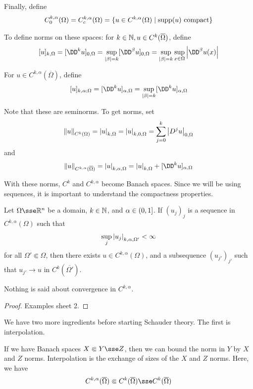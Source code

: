 \documentclass{article}
\begin{document}
Finally, define
\[C^{k, \alpha}_0(\Omega)=  C^{k, \alpha}_c(\Omega) = \{u \in C^{k, \alpha}(\Omega) \mid \operatorname{supp}(u) \text{ compact}\}\]

To define norms on these spaces: for \(k \in \mathbb{N}, u \in C^k(\overline\Omega)\), define
\[[u]_{k, \Omega} = [\DD^k u]_{0, \Omega} = \sup_{\abs{\beta} = k}[\DD^\beta u]_{0, \Omega} = \sup_{\abs{\beta} = k}\sup_{x \in \Omega}\abs{\DD^\beta u(x)}\]

For \(u \in C^{k, \alpha}(\overline \Omega)\), define
\[[u]_{k, \alpha; \Omega} = [\DD^ku]_{\alpha, \Omega} = \sup_{\abs{\beta} = k}[\DD^ku]_{\alpha, \Omega}\]

Note that these are seminorms. To get norms, set
\[\norm{u}_{C^k(\Omega)} = \abs{u}_{k, \Omega} = \abs{u}_{k, 0, \Omega} = \sum_{j=0}^k\abs{D^j u}_{0, \Omega}\]
and
\[\norm{u}_{C^{k, \alpha}(\overline\Omega)} = \abs{u}_{k, \alpha, \Omega} = \abs{u}_{k, \Omega} + [\DD^k u]_{\alpha, \Omega}\]

With these norms, \(C^k\) and \(C^{k, \alpha}\) become Banach spaces. Since we will be using sequences, it is important to understand the compactness properties.

\begin{theorem}
     Let \(\Omega \sse \R^n\) be a domain, \(k \in \mathbb{N}\), and \(\alpha \in (0, 1]\). If \((u_j)_j\) is a sequence in \(C^{k, \alpha}(\Omega)\) such that
    \[\sup_j \abs{u_j}_{k, \alpha, \Omega'} < \infty\]
    for all \(\Omega' \Subset \Omega\), then there exists \(u \in C^{k, \alpha}(\Omega)\), and a subsequence \((u_{j'})_{j'}\) such that \(u_{j'} \to u\) in \(C^k(\overline{\Omega'})\).
\end{theorem}

\begin{remark}
    Nothing is said about convergence in \(C^{k, \alpha}\).
\end{remark}

\begin{proof}
    Examples sheet 2.
\end{proof}

We have two more ingredients before starting Schauder theory. The first is interpolation.

If we have Banach spaces \(X \Subset Y \sse Z\), then we can bound the norm in \(Y\) by \(X\) and \(Z\) norms. Interpolation is the exchange of sizes of the \(X\) and \(Z\) norms. Here, we have
\[C^{k, \alpha}(\overline\Omega) \Subset C^k(\overline\Omega) \sse C^k(\overline\Omega)\]
\end{document}
